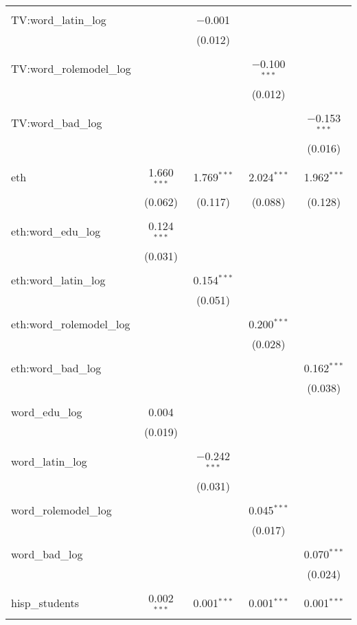 \begin{table}[!htbp]
\begin{tabular}{@{\extracolsep{-2pt}}lcccc}
  & & & & \\ 
 TV:word\_latin\_log &  & $-$0.001 &  &  \\ 
  &  & (0.012) &  &  \\ 
  & & & & \\ 
 TV:word\_rolemodel\_log &  &  & $-$0.100$^{***}$ &  \\ 
  &  &  & (0.012) &  \\ 
  & & & & \\ 
 TV:word\_bad\_log &  &  &  & $-$0.153$^{***}$ \\ 
  &  &  &  & (0.016) \\ 
  & & & & \\ 
 eth & 1.660$^{***}$ & 1.769$^{***}$ & 2.024$^{***}$ & 1.962$^{***}$ \\ 
  & (0.062) & (0.117) & (0.088) & (0.128) \\ 
  & & & & \\ 
 eth:word\_edu\_log & 0.124$^{***}$ &  &  &  \\ 
  & (0.031) &  &  &  \\ 
  & & & & \\ 
 eth:word\_latin\_log &  & 0.154$^{***}$ &  &  \\ 
  &  & (0.051) &  &  \\ 
  & & & & \\ 
 eth:word\_rolemodel\_log &  &  & 0.200$^{***}$ &  \\ 
  &  &  & (0.028) &  \\ 
  & & & & \\ 
 eth:word\_bad\_log &  &  &  & 0.162$^{***}$ \\ 
  &  &  &  & (0.038) \\ 
  & & & & \\ 
 word\_edu\_log & 0.004 &  &  &  \\ 
  & (0.019) &  &  &  \\ 
  & & & & \\ 
 word\_latin\_log &  & $-$0.242$^{***}$ &  &  \\ 
  &  & (0.031) &  &  \\ 
  & & & & \\ 
 word\_rolemodel\_log &  &  & 0.045$^{***}$ &  \\ 
  &  &  & (0.017) &  \\ 
  & & & & \\ 
 word\_bad\_log &  &  &  & 0.070$^{***}$ \\ 
  &  &  &  & (0.024) \\ 
  & & & & \\ 
 hisp\_students & 0.002$^{***}$ & 0.001$^{***}$ & 0.001$^{***}$ & 0.001$^{***}$ \\ 

\end{tabular}
\end{table}
